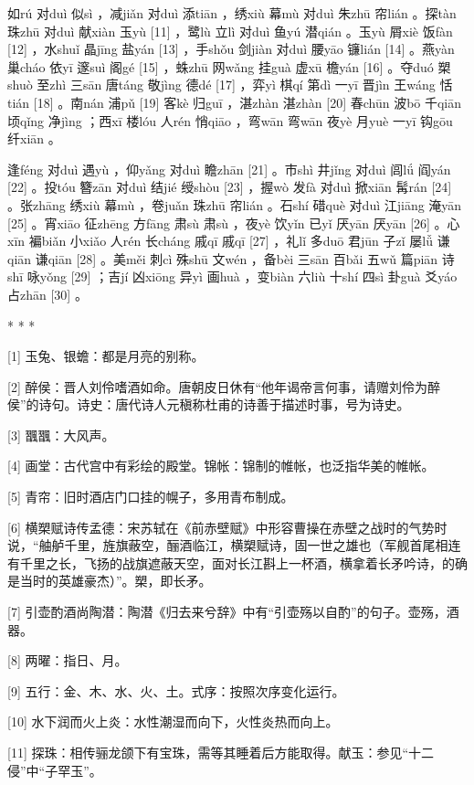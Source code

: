 \documentclass[12pt,UTF8]{ctexbook}
\begin{document}
如rú 对duì 似sì ，减jiǎn 对duì 添tiān ，绣xiù 幕mù 对duì 朱zhū 帘lián 。探tàn 珠zhū 对duì 献xiàn 玉yù [11] ，鹭lù 立lì 对duì 鱼yú 潜qián 。玉yù 屑xiè 饭fàn [12] ，水shuǐ 晶jīng 盐yán [13] ，手shǒu 剑jiàn 对duì 腰yāo 镰lián [14] 。燕yàn 巢cháo 依yī 邃suì 阁gé [15] ，蛛zhū 网wǎng 挂guà 虚xū 檐yán [16] 。夺duó 槊shuò 至zhì 三sān 唐táng 敬jìng 德dé [17] ，弈yì 棋qí 第dì 一yī 晋jìn 王wáng 恬tián [18] 。南nán 浦pǔ [19] 客kè 归guī ，湛zhàn 湛zhàn [20] 春chūn 波bō 千qiān 顷qǐng 净jìng ；西xī 楼lóu 人rén 悄qiāo ，弯wān 弯wān 夜yè 月yuè 一yī 钩gōu 纤xiān 。

逢féng 对duì 遇yù ，仰yǎng 对duì 瞻zhān [21] 。市shì 井jǐng 对duì 闾lǘ 阎yán [22] 。投tóu 簪zān 对duì 结jié 绶shòu [23] ，握wò 发fà 对duì 掀xiān 髯rán [24] 。张zhāng 绣xiù 幕mù ，卷juǎn 珠zhū 帘lián 。石shí 碏què 对duì 江jiāng 淹yān [25] 。宵xiāo 征zhēng 方fāng 肃sù 肃sù ，夜yè 饮yǐn 已yǐ 厌yān 厌yān [26] 。心xīn 褊biǎn 小xiǎo 人rén 长cháng 戚qī 戚qī [27] ，礼lǐ 多duō 君jūn 子zǐ 屡lǚ 谦qiān 谦qiān [28] 。美měi 刺cì 殊shū 文wén ，备bèi 三sān 百bǎi 五wǔ 篇piān 诗shī 咏yǒng [29] ；吉jí 凶xiōng 异yì 画huà ，变biàn 六liù 十shí 四sì 卦guà 爻yáo 占zhān [30] 。



* * *



[1] 玉兔、银蟾：都是月亮的别称。

[2] 醉侯：晋人刘伶嗜酒如命。唐朝皮日休有“他年谒帝言何事，请赠刘伶为醉侯”的诗句。诗史：唐代诗人元稹称杜甫的诗善于描述时事，号为诗史。

[3] 飁飁：大风声。

[4] 画堂：古代宫中有彩绘的殿堂。锦帐：锦制的帷帐，也泛指华美的帷帐。

[5] 青帘：旧时酒店门口挂的幌子，多用青布制成。

[6] 横槊赋诗传孟德：宋苏轼在《前赤壁赋》中形容曹操在赤壁之战时的气势时说，“舳舻千里，旌旗蔽空，酾酒临江，横槊赋诗，固一世之雄也（军舰首尾相连有千里之长，飞扬的战旗遮蔽天空，面对长江斟上一杯酒，横拿着长矛吟诗，的确是当时的英雄豪杰）”。槊，即长矛。

[7] 引壶酌酒尚陶潜：陶潜《归去来兮辞》中有“引壶殇以自酌”的句子。壶殇，酒器。

[8] 两曜：指日、月。

[9] 五行：金、木、水、火、土。式序：按照次序变化运行。

[10] 水下润而火上炎：水性潮湿而向下，火性炎热而向上。

[11] 探珠：相传骊龙颌下有宝珠，需等其睡着后方能取得。献玉：参见“十二侵”中“子罕玉”。
\end{document}

